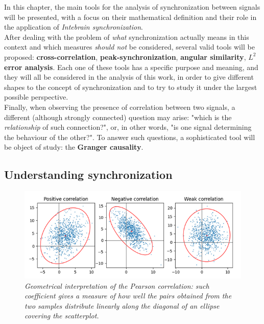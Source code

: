 \documentclass[a4paper]{article}
\begin{document}
In this chapter, the main tools for the analysis of synchronization between signals will be presented, with a focus on their mathematical definition and their role in the application of \textit{Intebrain synchronization}.\\
After dealing with the problem of \textit{what} synchronization actually means in this context and which measures \textit{should not} be considered, several valid tools will be proposed:\textbf{ cross-correlation}, \textbf{peak-synchronization}, \textbf{angular similarity}, \textbf{$L^2$ error analysis}. Each one of these tools has a specific purpose and meaning, and they will all be considered in the analysis of this work, in order to give different shapes to the concept of synchronization and to try to study it under the largest possible perspective.\\
Finally, when observing the presence of correlation between two signals, a different (although strongly connected) question may arise: "which is the \textit{relationship} of such connection?", or, in other words, "is one signal determining the behaviour of the other?". To answer such questions, a sophisticated tool will be object of study: the \textbf{Granger causality}.


\subsection{Understanding synchronization}

\begin{figure}[H]
	\begin{center}
		\includegraphics[scale=.75]{pearson.png} 
	\end{center} 
	\caption{\textit{Geometrical interpretation of the Pearson correlation: such coefficient gives a measure of how well the pairs obtained from the two samples distribute linearly along the diagonal of an ellipse covering the scatterplot. }}
	
\end{figure}
\end{document}
